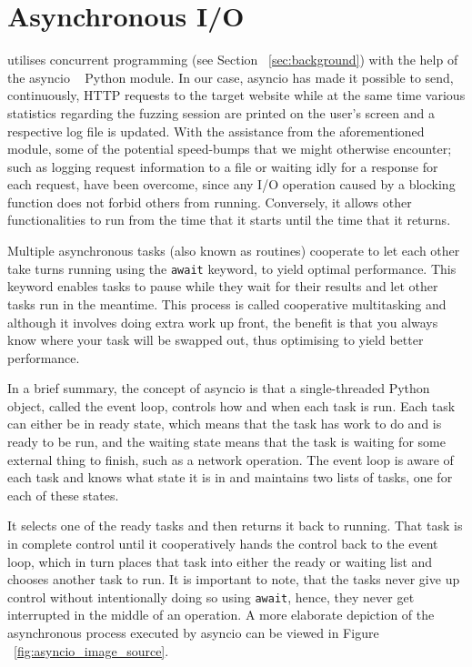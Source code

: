 \section{Asynchronous I/O}
\pname{} utilises concurrent programming (see Section ~\ref{sec:background}) with the help of the asyncio ~\cite{asyncio} Python module. In our case, asyncio has made it possible to send, continuously, HTTP requests to the target website while at the same time various statistics regarding the fuzzing session are printed on the user's screen and a respective log file is updated. With the assistance from the aforementioned module, some of the potential speed-bumps that we might otherwise encounter; such as logging request information to a file or waiting idly for a response for each request, 
have been overcome, since any I/O operation caused by a blocking function does not forbid others from running. Conversely, it allows other functionalities to run from the time that it starts until the time that it returns. 

Multiple asynchronous tasks (also known as routines) cooperate to let each other take turns running using the {\tt await} keyword, to yield optimal performance. This keyword enables tasks to pause while they wait for their results and let other tasks run in the meantime. This process is called cooperative multitasking and although it involves doing extra work up front, the benefit is that you always know where your task will be swapped out, thus optimising to yield better performance.

In a brief summary, the concept of asyncio is that a single-threaded Python object, called the event loop, controls how and when each task is run. Each task can either be in ready state, which means that the task has work to do and is ready to be run, and the waiting state means that the task is waiting for some external thing to finish, such as a network operation. The event loop is aware of each task and knows what state it is in and maintains two lists of tasks, one for each of these states. 

It selects one of the ready tasks and then returns it back to running. That task is in complete control until it cooperatively hands the control back to the event loop, which in turn places that task into either the ready or waiting list and chooses another task to run. It is important to note, that the tasks never give up control without intentionally doing so using {\tt await}, hence, they never get interrupted in the middle of an operation. A more elaborate depiction of the asynchronous process executed by asyncio can be viewed in Figure ~\ref{fig:asyncio_image_source}.

